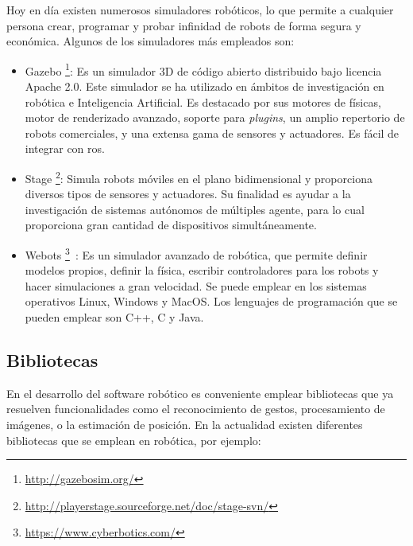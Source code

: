 Hoy en día existen numerosos simuladores robóticos, lo que permite a cualquier persona crear, programar y probar infinidad de robots de forma segura y económica. Algunos de los simuladores más empleados son:

\begin{itemize}
\item Gazebo \footnote{\url{http://gazebosim.org/}}: Es un simulador 3D de código abierto distribuido bajo licencia Apache 2.0. Este simulador se ha utilizado en ámbitos de investigación en robótica e Inteligencia Artificial. Es destacado por sus motores de físicas, motor de renderizado avanzado, soporte para \textit{plugins}, un amplio repertorio de robots comerciales, y una extensa gama de sensores y actuadores. Es fácil de integrar con \acrshort{ros}.
\item Stage \footnote{\url{http://playerstage.sourceforge.net/doc/stage-svn/}}: Simula robots móviles en el plano bidimensional y proporciona diversos tipos de sensores y actuadores. Su finalidad es ayudar a la investigación de sistemas autónomos de múltiples agente, para lo cual proporciona gran cantidad de dispositivos simultáneamente.
\item Webots \footnote{\url{https://www.cyberbotics.com/}}~\cite{webots}: Es un simulador avanzado de robótica, que permite definir modelos propios, definir la física, escribir controladores para los robots y hacer simulaciones a gran velocidad. Se puede emplear en los sistemas operativos Linux, Windows y MacOS. Los lenguajes de programación que se pueden emplear son  C++, C y Java.
\end{itemize}

\subsection{Bibliotecas}
En el desarrollo del software robótico es conveniente emplear bibliotecas que ya resuelven funcionalidades como el reconocimiento de gestos, procesamiento de imágenes, o la estimación de posición. En la actualidad existen diferentes bibliotecas que se emplean en robótica, por ejemplo:


